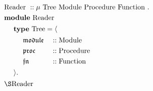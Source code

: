 \documentclass[12pt, preview]{standalone}
\begin{document}
\begin{math}
\begin{aligned}
  \ & \mathrm{Reader\ } :: \mu \mathrm{\ Tree\ } \mathrm{Module\ } \mathrm{Procedure\ } \mathrm{Function\ } \mathbf{.}  \\
    & \mathbf{module\ } \mathrm{Reader}  \\
    & \ 
  \begin{aligned}
    \quad & \mathbf{type\ } \mathrm{Tree} = \langle \\
    & \quad \ 
    \begin{aligned}
      & \mathfrak{module} & & :: \mathrm{Module} \\
      & \mathfrak{proc}   & & :: \mathrm{Procedure} \\
      & \mathfrak{fn}     & & :: \mathrm{Function} \\
    \end{aligned} \\
    & \rangle \mathbf{.} \\
  \end{aligned} \\
  & \mathbf{\S}\mathrm{Reader}
\end{aligned}
\end{math}
\end{document}
